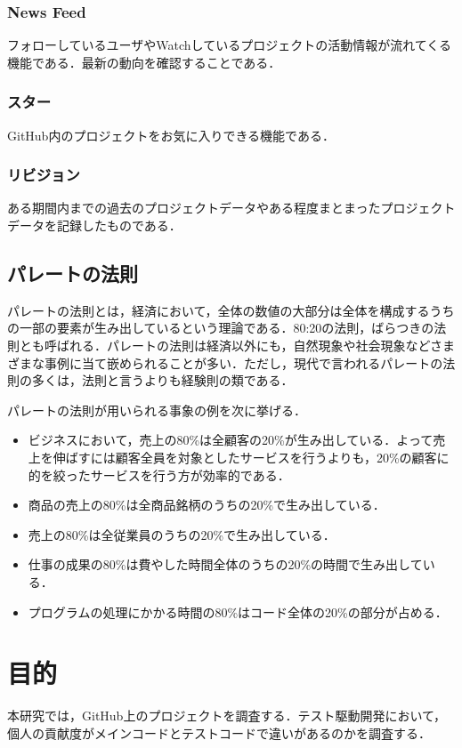 \subsection{News Feed}
フォローしているユーザやWatchしているプロジェクトの活動情報が流れてくる機能である．最新の動向を確認することである．

\subsection{スター}
GitHub内のプロジェクトをお気に入りできる機能である．

\subsection{リビジョン}
ある期間内までの過去のプロジェクトデータやある程度まとまったプロジェクトデータを記録したものである．

\newpage

\section{パレートの法則}
パレートの法則とは，経済において，全体の数値の大部分は全体を構成するうちの一部の要素が生み出しているという理論である．80:20の法則，ばらつきの法則とも呼ばれる．パレートの法則は経済以外にも，自然現象や社会現象などさまざまな事例に当て嵌められることが多い．ただし，現代で言われるパレートの法則の多くは，法則と言うよりも経験則の類である\cite{pare}．

パレートの法則が用いられる事象の例を次に挙げる．
\begin{itemize}
\item ビジネスにおいて，売上の80\%は全顧客の20\%が生み出している．よって売上を伸ばすには顧客全員を対象としたサービスを行うよりも，20\%の顧客に的を絞ったサービスを行う方が効率的である．
\item 商品の売上の80\%は全商品銘柄のうちの20\%で生み出している．
\item 売上の80\%は全従業員のうちの20\%で生み出している．
\item 仕事の成果の80\%は費やした時間全体のうちの20\%の時間で生み出している．
\item プログラムの処理にかかる時間の80\%はコード全体の20\%の部分が占める．
\end{itemize}



\chapter{目的}	
本研究では，GitHub上のプロジェクトを調査する．テスト駆動開発において，個人の貢献度がメインコードとテストコードで違いがあるのかを調査する．


